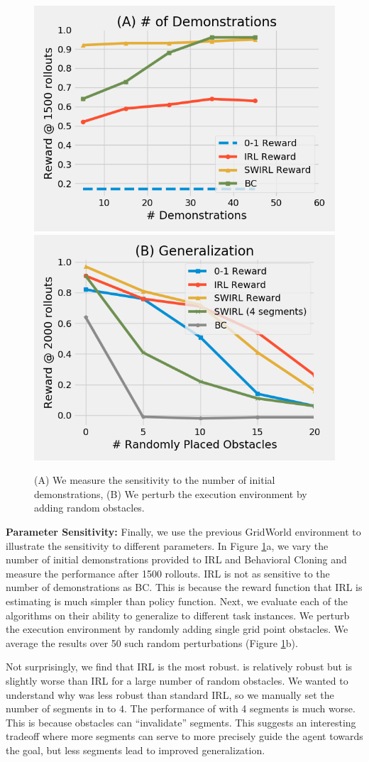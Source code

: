 \begin{figure}[t]
\centering
 \includegraphics[width=0.48\columnwidth]{concept/3-1.png}
  \includegraphics[width=0.48\columnwidth]{concept/3-2.png}
 \caption{(A) We measure the sensitivity to the number of initial demonstrations, (B) We perturb the execution environment by adding random obstacles. \label{concept:6}}
\end{figure}

\vspace{0.5em} \noindent \textbf{Parameter Sensitivity: } Finally, we use the previous GridWorld environment to illustrate the sensitivity to different parameters. In Figure \ref{concept:6}a, we vary the number of initial demonstrations provided to IRL and Behavioral Cloning and measure the performance after 1500 rollouts.
IRL is not as sensitive to the number of demonstrations as BC.
This is because the reward function that IRL is estimating is much simpler than policy function.
Next, we evaluate each of the algorithms on their ability to generalize to different task instances.
We perturb the execution environment by randomly adding single grid point obstacles.
We average the results over 50 such random perturbations (Figure \ref{concept:6}b).

Not surprisingly, we find that IRL is the most robust.
\hirl is relatively robust but is slightly worse than IRL for a large number of random obstacles.
We wanted to understand why \hirl was less robust than standard IRL, so we manually set the number of segments in \hirl to $4$.
The performance of \hirl with 4 segments is much worse.
This is because obstacles can ``invalidate'' segments.
This suggests an interesting tradeoff where more segments can serve to more precisely guide the agent towards the goal, but less segments lead to improved generalization.

